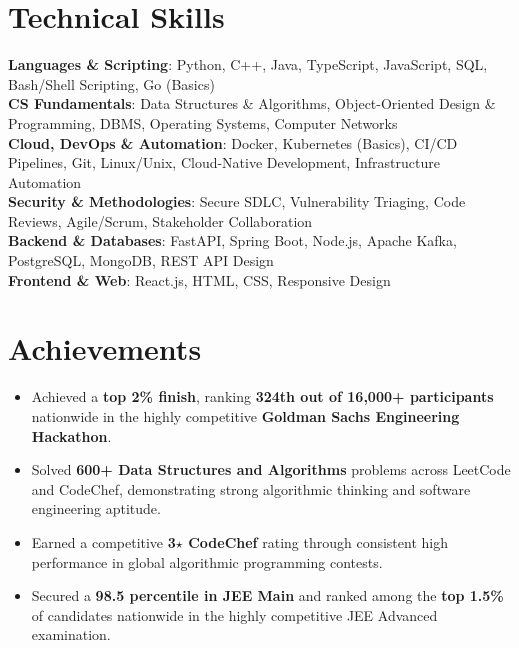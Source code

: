 \documentclass[a4paper,10pt]{article}
\newcommand{\resumeItemListStart}{\begin{itemize}[leftmargin=0.15in, itemsep=1pt, parsep=0pt, topsep=1pt, partopsep=0pt]}
\newcommand{\resumeItemListEnd}{\end{itemize}\vspace{0pt}}
\newcommand{\resumeItem}[1]{\item\small{#1}}
\begin{document}
\section{Technical Skills}
 \begin{itemize}[leftmargin=0in, label={}]
    \small{\item{
     \textbf{Languages \& Scripting}{: Python, C++, Java, TypeScript, JavaScript, SQL, Bash/Shell Scripting, Go (Basics)} \\ \vspace{2pt}
     \textbf{CS Fundamentals}{: Data Structures \& Algorithms, Object-Oriented Design \& Programming, DBMS, Operating Systems, Computer Networks} \\ \vspace{2pt}
     \textbf{Cloud, DevOps \& Automation}{: Docker, Kubernetes (Basics), CI/CD Pipelines, Git, Linux/Unix, Cloud-Native Development, Infrastructure Automation} \\ \vspace{2pt}
     \textbf{Security \& Methodologies}{: Secure SDLC, Vulnerability Triaging, Code Reviews, Agile/Scrum, Stakeholder Collaboration} \\ \vspace{2pt}
     \textbf{Backend \& Databases}{: FastAPI, Spring Boot, Node.js, Apache Kafka, PostgreSQL, MongoDB, REST API Design} \\ \vspace{2pt}
     \textbf{Frontend \& Web}{: React.js, HTML, CSS, Responsive Design}
    }}
 \end{itemize}

\vspace{-12pt}
\section{Achievements}
\resumeItemListStart
    \resumeItem{Achieved a \textbf{top 2\% finish}, ranking \textbf{324th out of 16,000+ participants} nationwide in the highly competitive \textbf{Goldman Sachs Engineering Hackathon}.}
    \resumeItem{Solved \textbf{600+ Data Structures and Algorithms} problems across LeetCode and CodeChef, demonstrating strong algorithmic thinking and software engineering aptitude.}
    \resumeItem{Earned a competitive \textbf{3\ensuremath{\star} CodeChef} rating through consistent high performance in global algorithmic programming contests.}
    \resumeItem{Secured a \textbf{98.5 percentile in JEE Main} and ranked among the \textbf{top 1.5\%} of candidates nationwide in the highly competitive JEE Advanced examination.}
\resumeItemListEnd
\end{document}
